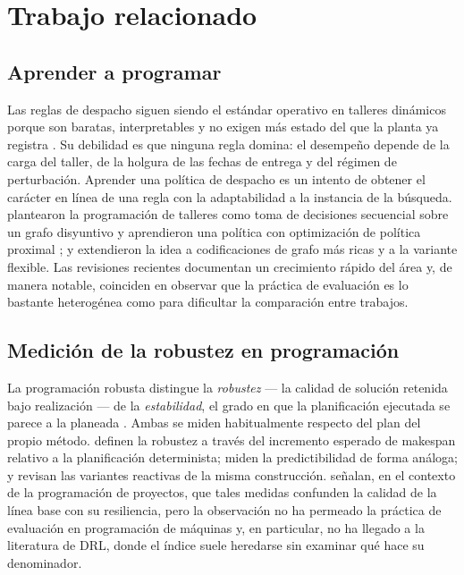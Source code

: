 \documentclass[a4paper,fleqn]{cas-sc}
\begin{document}
\section{Trabajo relacionado}\label{sec:related}

\subsection{Aprender a programar}

Las reglas de despacho siguen siendo el estándar operativo en talleres
dinámicos porque son baratas, interpretables y no exigen más estado del que la
planta ya registra \citep{haupt1989,holthaus1997}. Su debilidad es que ninguna
regla domina: el desempeño depende de la carga del taller, de la holgura de las
fechas de entrega y del régimen de perturbación. Aprender una política de
despacho es un intento de obtener el carácter en línea de una regla con la
adaptabilidad a la instancia de la búsqueda. \citet{zhang2020} plantearon la
programación de talleres como toma de decisiones secuencial sobre un grafo
disyuntivo y aprendieron una política con optimización de política proximal
\citep{schulman2017}; \citet{park2021} y \citet{song2023} extendieron la idea a
codificaciones de grafo más ricas y a la variante flexible. Las revisiones
recientes \citep{kayhan2023,smit2025,huang2025,xu2024survey} documentan un
crecimiento rápido del área y, de manera notable, coinciden en observar que la
práctica de evaluación es lo bastante heterogénea como para dificultar la
comparación entre trabajos.

\subsection{Medición de la robustez en programación}

La programación robusta distingue la \emph{robustez} --- la calidad de solución
retenida bajo realización --- de la \emph{estabilidad}, el grado en que la
planificación ejecutada se parece a la planeada \citep{leon1994,goren2008}.
Ambas se miden habitualmente respecto del plan del propio método.
\citet{leon1994} definen la robustez a través del incremento esperado de
makespan relativo a la planificación determinista; \citet{mehta1998} miden la
predictibilidad de forma análoga; \citet{sabuncuoglu2000} y \citet{aytug2005}
revisan las variantes reactivas de la misma construcción.
\citet{herroelen2005} señalan, en el contexto de la programación de proyectos,
que tales medidas confunden la calidad de la línea base con su resiliencia, pero
la observación no ha permeado la práctica de evaluación en programación de
máquinas y, en particular, no ha llegado a la literatura de DRL, donde el índice
suele heredarse sin examinar qué hace su denominador.
\end{document}
